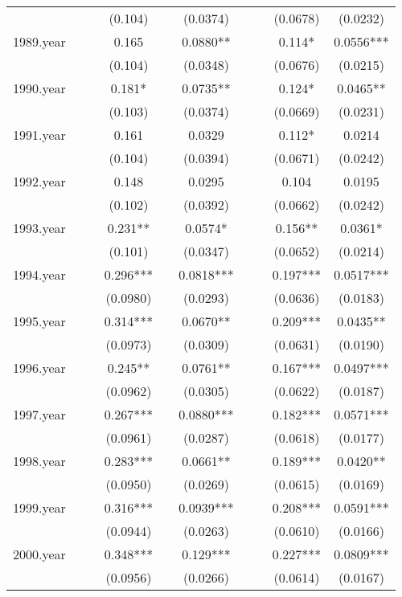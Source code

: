 \documentclass[]{article}
\begin{document}
\begin{tabular}{lccccccccc}
 &  &  & (0.104) &  & (0.0374) &  &  & (0.0678) & (0.0232) \\
1989.year &  &  & 0.165 &  & 0.0880** &  &  & 0.114* & 0.0556*** \\
 &  &  & (0.104) &  & (0.0348) &  &  & (0.0676) & (0.0215) \\
1990.year &  &  & 0.181* &  & 0.0735** &  &  & 0.124* & 0.0465** \\
 &  &  & (0.103) &  & (0.0374) &  &  & (0.0669) & (0.0231) \\
1991.year &  &  & 0.161 &  & 0.0329 &  &  & 0.112* & 0.0214 \\
 &  &  & (0.104) &  & (0.0394) &  &  & (0.0671) & (0.0242) \\
1992.year &  &  & 0.148 &  & 0.0295 &  &  & 0.104 & 0.0195 \\
 &  &  & (0.102) &  & (0.0392) &  &  & (0.0662) & (0.0242) \\
1993.year &  &  & 0.231** &  & 0.0574* &  &  & 0.156** & 0.0361* \\
 &  &  & (0.101) &  & (0.0347) &  &  & (0.0652) & (0.0214) \\
1994.year &  &  & 0.296*** &  & 0.0818*** &  &  & 0.197*** & 0.0517*** \\
 &  &  & (0.0980) &  & (0.0293) &  &  & (0.0636) & (0.0183) \\
1995.year &  &  & 0.314*** &  & 0.0670** &  &  & 0.209*** & 0.0435** \\
 &  &  & (0.0973) &  & (0.0309) &  &  & (0.0631) & (0.0190) \\
1996.year &  &  & 0.245** &  & 0.0761** &  &  & 0.167*** & 0.0497*** \\
 &  &  & (0.0962) &  & (0.0305) &  &  & (0.0622) & (0.0187) \\
1997.year &  &  & 0.267*** &  & 0.0880*** &  &  & 0.182*** & 0.0571*** \\
 &  &  & (0.0961) &  & (0.0287) &  &  & (0.0618) & (0.0177) \\
1998.year &  &  & 0.283*** &  & 0.0661** &  &  & 0.189*** & 0.0420** \\
 &  &  & (0.0950) &  & (0.0269) &  &  & (0.0615) & (0.0169) \\
1999.year &  &  & 0.316*** &  & 0.0939*** &  &  & 0.208*** & 0.0591*** \\
 &  &  & (0.0944) &  & (0.0263) &  &  & (0.0610) & (0.0166) \\
2000.year &  &  & 0.348*** &  & 0.129*** &  &  & 0.227*** & 0.0809*** \\
 &  &  & (0.0956) &  & (0.0266) &  &  & (0.0614) & (0.0167) \\

\end{tabular}
\end{document}
